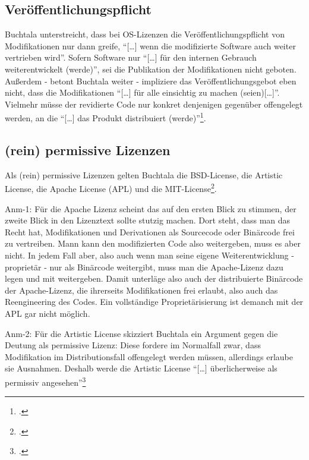 \documentclass[DIV=calc,BCOR=5mm,11pt,headings=small,oneside,abstract=true, toc=bib]{scrartcl}
\begin{document}
\subsection{Veröffentlichungspflicht}
Buchtala unterstreicht, dass bei OS-Lizenzen die Veröffentlichungspflicht von
Modifikationen nur dann greife, \enquote{[\ldots] wenn die modifizierte Software
auch weiter vertrieben wird}. Sofern Software nur \enquote{[\ldots] für den
internen Gebrauch weiterentwickelt (werde)}, sei die Publikation der
Modifikationen nicht geboten. Außerdem - betont Buchtala weiter - impliziere das
Veröffentlichungsgebot eben nicht, dass die Modifikationen \enquote{[\ldots] für
alle einsichtig zu machen (seien)[\ldots]}. Vielmehr müsse der revidierte
Code nur konkret denjenigen gegenüber offengelegt werden, an die \enquote{[\ldots]
das Produkt distribuiert (werde)}\footcite[cf.][168 - B. beruft sich
selbst auf Henkel 2003 u. 2004b]{Buchtala2007a}.

\subsection{(rein) permissive Lizenzen}
Als (rein) permissive Lizenzen gelten Buchtala die BSD-License, die Artistic
License, die Apache License (APL) und die
MIT-License\footcite[cf.][62]{Buchtala2007a}.

Anm-1: Für die Apache Lizenz scheint das auf den ersten Blick zu stimmen, der
zweite Blick in den Lizenztext sollte stutzig machen. Dort steht, dass man das
Recht hat, Modifikationen und Derivationen als Sourcecode oder Binärcode frei zu
vertreiben. Mann kann den modifizierten Code also weitergeben, muss es aber
nicht. In jedem Fall aber, also auch wenn man seine eigene Weiterentwicklung -
proprietär - nur als Binärcode weitergibt, muss man die Apache-Lizenz dazu legen
und mit weitergeben. Damit unterläge also auch der distribuierte Binärcode der
Apache-Lizenz, die ihrerseits Modifikationen frei erlaubt, also auch das
Reengineering des Codes. Ein vollständige Proprietärisierung ist demanch mit der
APL gar nicht möglich.

Anm-2: Für die Artistic License skizziert Buchtala ein Argument gegen die
Deutung als permissive Lizenz: Diese fordere im Normalfall zwar, dass
Modifikation im Distributionsfall offengelegt werden müssen, allerdings erlaube
sie Ausnahmen. Deshalb werde die Artistic License \enquote{[\ldots]
überlicherweise als permissiv angesehen}\footcite[cf.][61 B. beruft
sich auf Perens, 1999 und Lerner und Tirole 2005, jeweils ohne nähere
Seitenangabe]{Buchtala2007a}
\end{document}
